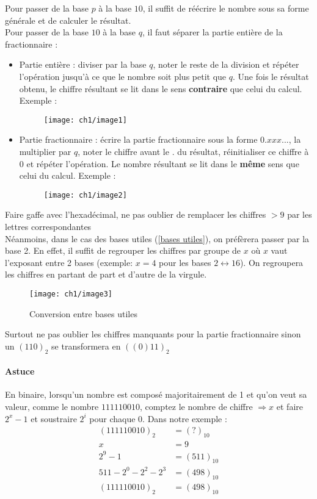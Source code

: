 Pour passer de la base $p$ à la base $10$, il suffit de réécrire le nombre sous sa forme générale et de calculer le résultat. \\
Pour passer de la base $10$ à la base $q$, il faut séparer la partie entière de la fractionnaire :
\begin{itemize}
	\item Partie entière : diviser par la base $q$, noter le reste de la division et répéter l'opération jusqu'à ce que le nombre soit plus petit que $q$. Une fois le résultat obtenu, le chiffre résultant se lit dans le sens \textbf{contraire} que celui du calcul. Exemple :
	\begin{figure}[H]
		\centering
		\texttt{[image: ch1/image1]}
	\end{figure}
	\item Partie fractionnaire : écrire la partie fractionnaire sous la forme $0.xxx...$, la multiplier par $q$, noter le chiffre avant le $.$ du résultat, réinitialiser ce chiffre à $0$ et répéter l'opération. Le nombre résultant se lit dans le \textbf{même} sens que celui du calcul. Exemple :
	\begin{figure}[H]
		\centering
		\texttt{[image: ch1/image2]}
	\end{figure}
\end{itemize}
\danger Faire gaffe avec l'hexadécimal, ne pas oublier de remplacer les chiffres $>9$ par les lettres correspondantes\\

Néanmoins, dans le cas des bases utiles (\autoref{bases utiles}), on préfèrera passer par la base 2. En effet, il suffit de regrouper les chiffres par groupe de $x$ où $x$ vaut l'exposant entre 2 bases (exemple: $x=4$ pour les bases $2\leftrightarrow 16$). On regroupera les chiffres en partant de part et d'autre de la virgule.
\begin{figure}[H]
	\centering
	\texttt{[image: ch1/image3]}
	\caption{Conversion entre bases utiles}
\end{figure}
\danger Surtout ne pas oublier les chiffres manquants pour la partie fractionnaire sinon un $(110)_2$ se transformera en $((0)11)_2$
\paragraph{Astuce} En binaire, lorsqu'un nombre est composé majoritairement de 1 et qu'on veut sa valeur, comme le nombre $111110010$, comptez le nombre de chiffre $\Rightarrow x$ et faire $2^x-1$ et soustraire $2^i$ pour chaque 0. Dans notre exemple :
\begin{align}
	(111110010)_2 &=(?)_{10}\\
	x &=9\\
	2^9-1 &=(511)_{10}\\
	511-2^0-2^2-2^3 &=(498)_{10}\\
	(111110010)_2 &=(498)_{10}
\end{align}
